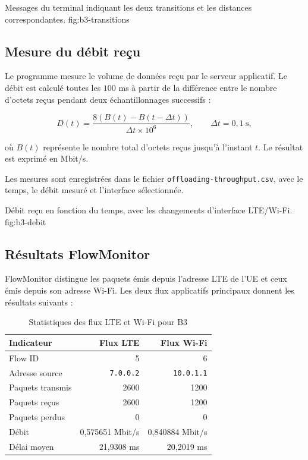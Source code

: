 {Messages du terminal indiquant les deux transitions et les distances correspondantes.}
{fig:b3-transitions}

\subsection{Mesure du débit reçu}

Le programme mesure le volume de données reçu par le
serveur applicatif. Le débit est calculé toutes les
$100$ ms à partir de la différence entre le nombre
d'octets reçus pendant deux échantillonnages successifs :

\[
D(t)=
\frac{8\left(B(t)-B(t-\Delta t)\right)}
{\Delta t \times 10^6},
\qquad \Delta t=0,1\ \text{s},
\]

où $B(t)$ représente le nombre total d'octets reçus
jusqu'à l'instant $t$. Le résultat est exprimé en Mbit/s.

Les mesures sont enregistrées dans le fichier
\texttt{offloading-throughput.csv}, avec le temps,
le débit mesuré et l'interface sélectionnée.

{Débit reçu en fonction du temps, avec les changements d'interface LTE/Wi-Fi.}
{fig:b3-debit}

\subsection{Résultats FlowMonitor}

FlowMonitor distingue les paquets émis depuis l'adresse
LTE de l'UE et ceux émis depuis son adresse Wi-Fi.
Les deux flux applicatifs principaux donnent les résultats
suivants :

\begin{table}[H]
    \centering
    \caption{Statistiques des flux LTE et Wi-Fi pour B3}
    \label{tab:b3-flowmonitor}
    \begin{tabular}{lrr}
        \toprule
        \textbf{Indicateur} & \textbf{Flux LTE} & \textbf{Flux Wi-Fi} \\
        \midrule
        Flow ID & 5 & 6 \\
        Adresse source & \texttt{7.0.0.2} & \texttt{10.0.1.1} \\
        Paquets transmis & 2600 & 1200 \\
        Paquets reçus & 2600 & 1200 \\
        Paquets perdus & 0 & 0 \\
        Débit & 0,575651 Mbit/s & 0,840884 Mbit/s \\
        Délai moyen & 21,9308 ms & 20,2019 ms \\
        \bottomrule
    \end{tabular}
\end{table}

